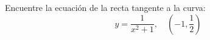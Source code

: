 \item Encuentre la ecuación de la recta tangente a la curva:
$$y = \frac{1}{x^2 + 1}, \quad \left(-1, \frac{1}{2}\right)$$
